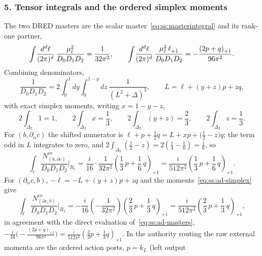 \subsubsection*{5. Tensor integrals and the ordered simplex moments}

The two DRED masters are the scalar master~\eqref{eq:ss:masterintegral} and
its rank-one partner,
\begin{equation}\label{eq:ss:ad-masters}
\int\!\frac{d^{d}\ell}{(2\pi)^{d}}\,\frac{\mu_\ell^{2}}{D_{0}D_{1}D_{2}}
=\frac{1}{32\pi^{2}},
\qquad
\int\!\frac{d^{d}\ell}{(2\pi)^{d}}\,
\frac{\mu_\ell^{2}\,\ell_{+\dot1}}{D_{0}D_{1}D_{2}}
=-\frac{(2p+q)_{+\dot1}}{96\pi^{2}} .
\end{equation}
Combining denominators,
\begin{equation}\label{eq:ss:ad-feynman}
\frac{1}{D_{0}D_{1}D_{2}}
=2\int_{0}^{1}\!dy\int_{0}^{1-y}\!dz\,\frac{1}{(L^{2}+\Delta)^{3}},
\qquad
L=\ell+(y+z)p+zq,
\end{equation}
with exact simplex moments, writing $x=1-y-z$,
\begin{equation}\label{eq:ss:ad-simplex}
2\!\int_{\Delta_{2}}\!1=1,\qquad
2\!\int_{\Delta_{2}}\!x=\frac13,\qquad
2\!\int_{\Delta_{2}}\!(y+z)=\frac23,\qquad
2\!\int_{\Delta_{2}}\!z=\frac13 .
\end{equation}
For $(b,\partial_{\dot\alpha}c)$ the shifted numerator is
$\ell+p+\frac12q=L+xp+\big(\frac12-z\big)q$; the term odd in $L$ integrates to
zero, and $2\int_{\Delta_{2}}(\tfrac12-z)=2(\tfrac14-\tfrac16)=\tfrac16$, so
\begin{equation}\label{eq:ss:ad-adint}
\int_{\ell}\frac{N^{\mathrm{ev}}_{(b,\partial c)}}{D_{0}D_{1}D_{2}}\Big|_{R_{1}}
=\frac{i}{16}\cdot\frac{1}{32\pi^{2}}
\left(\frac13\,p+\frac16\,q\right)_{+\dot1}
=\frac{i}{512\pi^{2}}\left(\frac13\,p+\frac16\,q\right)_{+\dot1} .
\end{equation}
For $(\partial_{\dot\alpha}c,b)$, $-\ell=-L+(y+z)p+zq$ and the
moments~\eqref{eq:ss:ad-simplex} give
\begin{equation}\label{eq:ss:ad-daint}
\int_{\ell}\frac{N^{\mathrm{ev}}_{(\partial c,b)}}{D_{0}D_{1}D_{2}}\Big|_{R_{2}}
=-\frac{i}{16}\left(-\frac{1}{32\pi^{2}}\right)
\left(\frac23\,p+\frac13\,q\right)_{+\dot1}
=\frac{i}{512\pi^{2}}\left(\frac23\,p+\frac13\,q\right)_{+\dot1} ,
\end{equation}
in agreement with the direct evaluation of~\eqref{eq:ss:ad-masters},
$-\frac{i}{16}\big(-\frac{(2p+q)_{+\dot1}}{96\pi^{2}}\big)
=\frac{i}{512\pi^{2}}(\frac23p+\frac13q)_{+\dot1}$. In the authority routing
the raw external momenta are the ordered action ports, $p=k_{L}$ (left output
